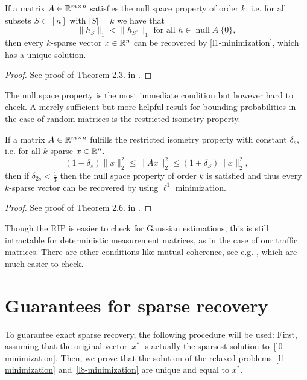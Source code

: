 \documentclass{article} %
\renewcommand{\null}{\operatorname{null}}
\begin{document}
\begin{theorem}
If a matrix $A \in \mathbb{R}^{m\times n}$ satisfies the null space property of order $k$, i.e. for all subsets $S \subset [n]$ with $|S| = k$ we have that
\begin{equation*}
\|h_S\|_1 < \|h_{S^c}\|_1 \text{ for all } h\in\null A \ \{0\},
\end{equation*}
then every $k$-sparse vector $x \in \mathbb{R}^n$ can be recovered by \eqref{l1-minimization}, which has a unique solution.
\end{theorem}
\begin{proof}
See proof of Theorem 2.3. in \cite{Rauhut}.
\end{proof}
The null space property is the most immediate condition but however hard to check. A merely sufficient but more helpful result for bounding probabilities in the case of random matrices is the restricted isometry property.

\begin{theorem}
If a matrix $A \in \mathbb{R}^{m\times n}$ fulfills the restricted isometry property with constant $\delta_s$, i.e. for all $k$-sparse $x\in \mathbb{R}^n$. 
\begin{equation}\label{RIP}
  (1-\delta_s)\|x\|_2^2 \leq \|Ax\|_2^2 \leq (1+\delta_S) \|x\|_2^2,
\end{equation}
then if $\delta_{2s} < \frac{1}{3}$ then the null space property of order $k$ is satisfied and thus every $k$-sparse vector can be recovered by using $\ell^1$ minimization.
\end{theorem}
\begin{proof}
See proof of Theorem 2.6. in \cite{Rauhut}.
\end{proof}

Though the RIP is easier to check for Gaussian estimations, this is still intractable for deterministic measurement matrices, as in the case of our traffic matrices. There are other conditions like mutual coherence, see e.g. \cite{Fuchs}, which are much easier to check.

\begin{theorem}[Incoherence]

\end{theorem}

\section{Guarantees for sparse recovery}\label{sec:theory}
To guarantee exact sparse recovery, the following procedure will be used: First, assuming that the original vector~$x^*$ is actually the sparsest solution to~\eqref{l0-minimization}. Then, we prove that the solution of the relaxed problems~\eqref{l1-minimization} and~\eqref{l8-minimization} are unique and equal to $x^*$.
\end{document}
